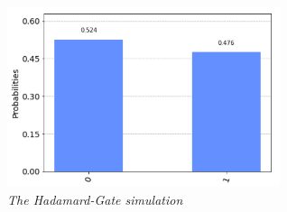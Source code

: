 \documentclass{article}
\begin{document}
\begin{figure}[h]
\begin{center}
\begin{minipage}[b]{8cm}
\centering
\includegraphics[width=8cm]{hadamard_sym.png}\\\textit{The Hadamard-Gate simulation}
\end{minipage}
\end{center}
\end{figure}
\newpage
\end{document}
